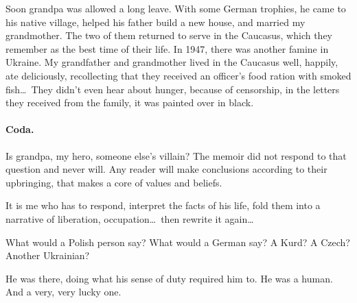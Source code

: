 Soon grandpa was allowed a long leave. With some German trophies,
he came to his native village, helped his father build a new house,
and married my grandmother. The two of them returned to serve in the
Caucasus, which they remember as the best time of their life. In 1947,
there was another famine in Ukraine. My grandfather and grandmother
lived in the Caucasus well, happily, ate deliciously, recollecting %
that
they received an officer's food ration with smoked fish\ldots\ They
didn't even hear about hunger, because of censorship, in the letters
they received from the family, it was painted over in black.

\paragraph{Coda.}\strut

Is grandpa, my hero, someone else's villain? The memoir did not
respond to that question and never will. Any reader will make
conclusions according to their upbringing, that makes a core of values
and beliefs.

It is me who has to respond, interpret the facts of his life, fold
them into a narrative of liberation, occupation\ldots\ then rewrite it
again\ldots

What would a Polish person say? What would a German say? A Kurd? A
Czech? Another Ukrainian?

He was there, doing what his sense of duty required him to. He was a
human. And a very, very lucky one.

% 
